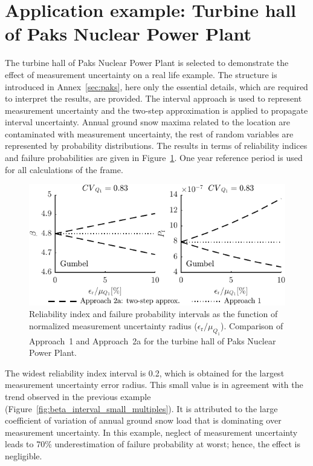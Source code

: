 \section{Application example: Turbine hall of Paks Nuclear Power Plant}
\label{sec:turbine_mu}

The turbine hall of Paks Nuclear Power Plant is selected to demonstrate the effect of measurement uncertainty on a real life example. The structure is introduced in Annex~\ref{sec:paks}, here only the essential details, which are required to interpret the results, are provided. The interval approach is used to represent measurement uncertainty and the two-step approximation is applied to propagate interval uncertainty. Annual ground snow maxima related to the location are contaminated with measurement uncertainty, the rest of random variables are represented by probability distributions. The results in terms of reliability indices and failure probabilities are given in Figure~\ref{fig:interval_beta_turbine_hall}. One year reference period is used for all calculations of the frame.

\begin{figure}[htbp!] 
	\centering    
	\includegraphics[]{interval_beta_turbine_hall.pdf}
	\caption{Reliability index and failure probability intervals as the function of normalized measurement uncertainty radius ($\epsilon_\mathrm{r}/\mu_{Q_1}$). Comparison of Approach~1 and Approach~2a for the turbine hall of Paks Nuclear Power Plant.}
	\label{fig:interval_beta_turbine_hall}
\end{figure}

The widest reliability index interval is 0.2, which is obtained for the largest measurement uncertainty error radius. This small value is in agreement with the trend observed in the previous example (Figure~\ref{fig:beta_interval_small_multiples}). It is attributed to the large coefficient of variation of annual ground snow load that is dominating over measurement uncertainty. In this example, neglect of measurement uncertainty leads to 70\% underestimation of failure probability at worst; hence, the effect is negligible.

